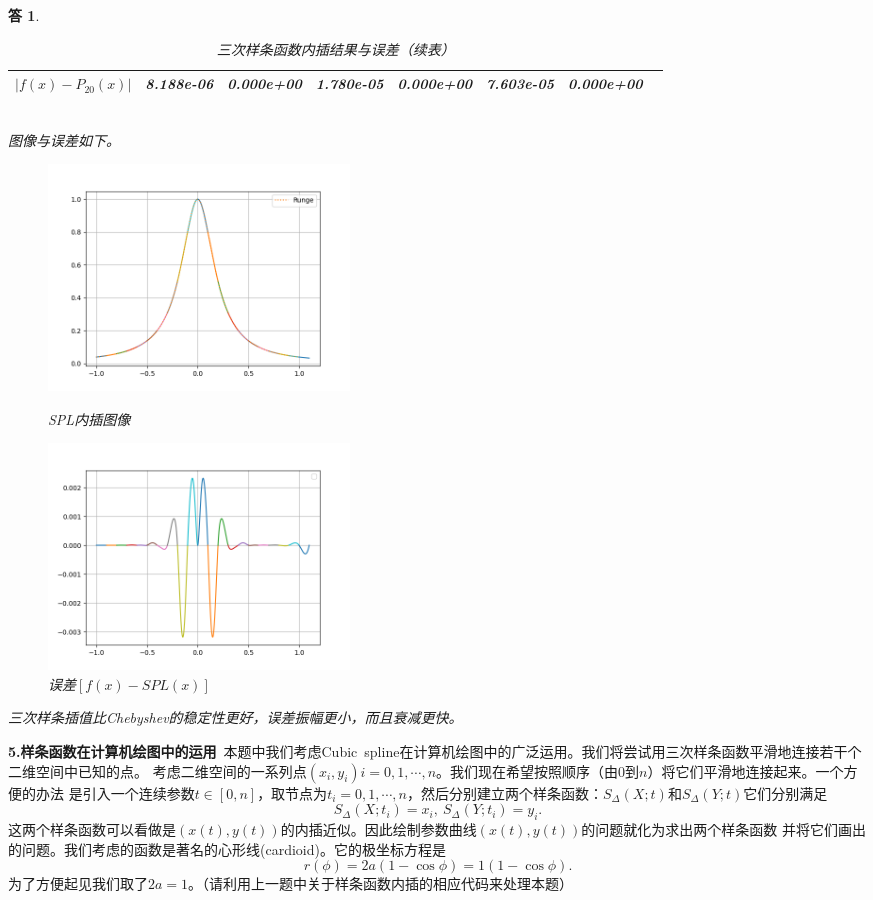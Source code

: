 \documentclass[10pt]{ctexart}
\newtheorem*{answer}{答}
\begin{document}
\begin{answer}
\begin{table}
\begin{tabular}{cccccccc}
            $\lvert f(x)-P_{20}(x)\rvert$ & 8.188e-06 & 0.000e+00 & 1.780e-05 & 0.000e+00 & 7.603e-05 & 0.000e+00&\\
            \bottomrule
        \end{tabular}
        \caption{三次样条函数内插结果与误差（续表）}
    \end{table}
    \ \\
    图像与误差如下。
    \begin{figure}[H]
        \centering
        \begin{minipage}{0.45\linewidth}
            \centering
            \includegraphics[width=8cm]{SPL.png}
            \caption{SPL内插图像}
        \end{minipage}
        \qquad
        \begin{minipage}{0.45\linewidth}
            \centering
            \includegraphics[width=8cm]{errSPL.png}
            \caption{误差$\left [f(x)-SPL(x)\right ]$}
        \end{minipage}
    \end{figure}
    三次样条插值比Chebyshev的稳定性更好，误差振幅更小，而且衰减更快。
\end{answer}
\textbf{5.样条函数在计算机绘图中的运用}\ 本题中我们考虑Cubic\ spline在计算机绘图中的广泛运用。我们将尝试用三次样条函数平滑地连接若干个二维空间中已知的点。
考虑二维空间的一系列点$(x_i, y_i)i=0,1,\cdots,n$。我们现在希望按照顺序（由$0$到$n$）将它们平滑地连接起来。一个方便的办法
是引入一个连续参数$t\in[0,n]$，取节点为$t_i=0,1,\cdots,n$，然后分别建立两个样条函数：$S_{\Delta}(X;t)$和$S_{\Delta}(Y;t)$它们分别满足
$$S_{\Delta}(X;t_i)=x_i,\ S_{\Delta}(Y;t_i)=y_i.$$
这两个样条函数可以看做是$(x(t),y(t))$的内插近似。因此绘制参数曲线$(x(t),y(t))$的问题就化为求出两个样条函数
并将它们画出的问题。我们考虑的函数是著名的心形线(cardioid)。它的极坐标方程是
$$r(\phi)=2a(1-\cos{\phi})=1(1-\cos{\phi}).$$
为了方便起见我们取了$2a=1$。（请利用上一题中关于样条函数内插的相应代码来处理本题）
\end{document}
